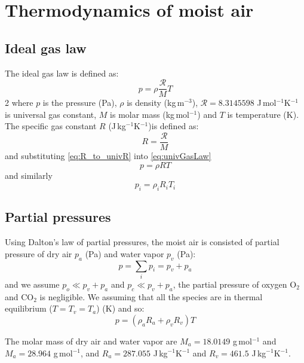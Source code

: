 \chapter{Thermodynamics of moist air}
\label{app:thermodynamics}


\section*{Ideal gas law}

The ideal gas law is defined as:
\begin{equation}
p = \rho\frac{\mathcal{R}}{M}T
\label{eq:univGasLaw}
\end{equation}2
where $p$ is the pressure (Pa), $\rho$ is density (kg\,m$^{-3}$), $\mathcal{R}=\num{8.3145598}$ J\,mol$^{-1}$K$^{-1}$ is universal gas constant, $M$ is molar mass (kg\,mol$^{-1}$) and $T$ is temperature (K). The specific gas constant $R$ (J\,kg$^{-1}$K$^{-1}$)is defined as:
\begin{equation}
R = \frac{\mathcal{R}}{M}
\label{eq:R_to_univR}
\end{equation}
and substituting \ref{eq:R_to_univR} into \ref{eq:univGasLaw}
\begin{equation}
p = \rho R T
\label{eq:idealGasLaw}
\end{equation}
and similarly
\begin{equation}
p_i = \rho_i R_i T_i
\label{eq:idealGasLaw2}
\end{equation}

\section*{Partial pressures}

Using Dalton's law of partial pressures, the moist air is consisted of partial pressure of dry air $p_a$ (Pa) and water vapor $p_v$ (Pa):
\begin{equation}
p = \sum_i p_i  = p_v + p_a
\label{eq:dalton}
\end{equation}
and we assume $p_o \ll p_v+p_a$ and $p_c\ll p_v + p_a$, the partial pressure of oxygen O$_2$ and CO$_2$ is negligible. We assuming that all the species are in thermal equilibrium ($T = T_v = T_a$) (K) and so:
\begin{equation}
p = \left(\rho_a R_a + \rho_v R_v \right) T
\end{equation}

The molar mass of dry air and water vapor are $M_a = \num{18.0149}$ g\,mol$^{-1}$ and $M_a=\num{28.964}$ g\,mol$^{-1}$, and $R_a = \num{287.055}$ J\,kg$^{-1}$K$^{-1}$ and $R_v = \num{461.5}$ J\,kg$^{-1}$K$^{-1}$.


